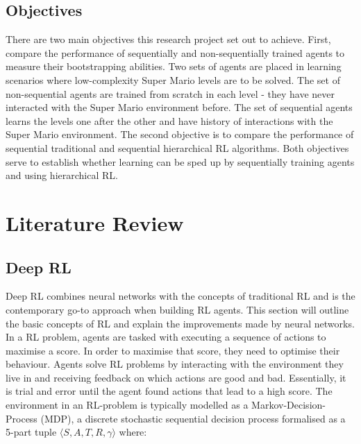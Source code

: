 \documentclass[notitlepage,a4paper,11pt]{article}
\begin{document}
\subsection{Objectives}
There are two main objectives this research project set out to achieve. First, compare the performance of sequentially and non-sequentially trained agents to measure their bootstrapping abilities. Two sets of agents are placed in learning scenarios where low-complexity Super Mario levels are to be solved. The set of non-sequential agents are trained from scratch in each level - they have never interacted with the Super Mario environment before. The set of sequential agents learns the levels one after the other and have history of interactions with the Super Mario environment. The second objective is to compare the performance of sequential traditional and sequential hierarchical RL algorithms. Both objectives serve to establish whether learning can be sped up by sequentially training agents and using hierarchical RL.

\section{Literature Review}


\subsection{Deep RL}\label{deep_rl}
Deep RL combines neural networks with the concepts of traditional RL and is the contemporary go-to approach when building RL agents. This section will outline the basic concepts of RL and explain the improvements made by neural networks. In a RL problem, agents are tasked with executing a sequence of actions to maximise a score. In order to maximise that score, they need to optimise their behaviour. Agents solve RL problems by interacting with the environment they live in and receiving feedback on which actions are good and bad. Essentially, it is trial and error until the agent found actions that lead to a high score. The environment in an RL-problem is typically modelled as a Markov-Decision-Process (MDP), a discrete stochastic sequential decision process \cite{puterman2014markov} formalised as a 5-part tuple $\langle S, A, T, R, \gamma \rangle$ where:
\end{document}
